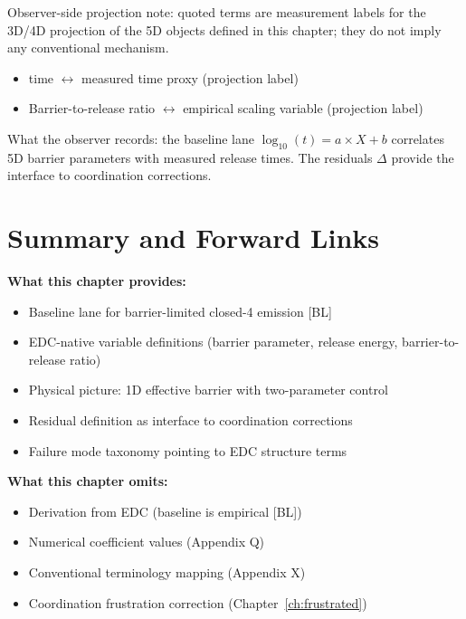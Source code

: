 \begin{observerbox}
Observer-side projection note: quoted terms are measurement labels for the
3D/4D projection of the 5D objects defined in this chapter; they do not
imply any conventional mechanism.

\begin{itemize}
    \item \ClosedFourRelease{} time $\leftrightarrow$ measured time proxy (projection label)
    \item Barrier-to-release ratio $\leftrightarrow$ empirical scaling variable (projection label)
\end{itemize}

What the observer records: the baseline lane $\log_{10}(t) = a \times X + b$
correlates 5D barrier parameters with measured release times. The residuals
$\Delta$ provide the interface to coordination corrections.
\end{observerbox}

\section{Summary and Forward Links}
\label{sec:gn:summary}

\begin{resultbox}
    \textbf{What this chapter provides:}
    \begin{itemize}
        \item Baseline lane for barrier-limited closed-4 emission [BL]
        \item EDC-native variable definitions (barrier parameter, release
              energy, barrier-to-release ratio)
        \item Physical picture: 1D effective barrier with two-parameter
              control
        \item Residual definition as interface to coordination corrections
        \item Failure mode taxonomy pointing to EDC structure terms
    \end{itemize}

    \textbf{What this chapter omits:}
    \begin{itemize}
        \item Derivation from EDC (baseline is empirical [BL])
        \item Numerical coefficient values (Appendix Q)
        \item Conventional terminology mapping (Appendix X)
        \item Coordination frustration correction (Chapter~\ref{ch:frustrated})
    \end{itemize}
\end{resultbox}

